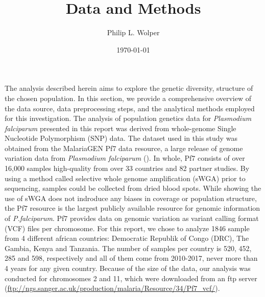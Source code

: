 \documentclass[11pt]{article}
\author{Philip L. Wolper}
\date{\today}
\title{Data and Methods}
\begin{document}
\maketitle
\tableofcontents

The analysis described herein aims to explore the genetic diversity, structure of the chosen population. In this section, we provide a comprehensive overview of the data source, data preprocessing steps, and the analytical methods employed for this investigation.
The analysis of population genetics data for \emph{Plasmodium falciparum} presented in this report was derived from whole-genome Single Nucleotide Polymorphism (SNP) data. The dataset used in this study was obtained from the MalariaGEN Pf7 data resource, a large release of genome variation data from \emph{Plasmodium falciparum} (\cite{MalariaGEN-2023-pf7}). In whole, Pf7 consists of over 16,000 samples high-quality from over 33 countries and 82 partner studies. By using a method called selective whole genome amplification (sWGA) prior to sequencing, samples could be collected from dried blood spots. While showing the use of sWGA does not indroduce any biases in coverage or population structure, the Pf7 resource is the largest publicly available resource for genomic information of \emph{P.falciparum}. Pf7 provides data on genomic variation as variant calling format (VCF) files per chromosome.
For this report, we chose to analyze 1846 sample from 4 different african countries: Democratic Republik of Congo (DRC), The Gambia, Kenya and Tanzania. The number of samples per country is 520, 452, 285 and 598, respectively and all of them come from 2010-2017, never more than 4 years for any given country. Because of the size of the data, our analysis was conducted for chromosomes 2 and 11, which were downloaded from an ftp server (\url{ftp://ngs.sanger.ac.uk/production/malaria/Resource/34/Pf7\_vcf/}).
\end{document}
